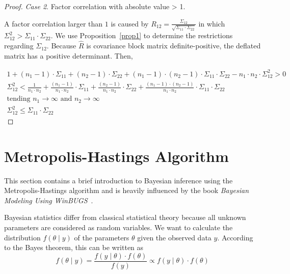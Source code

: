 \documentclass[11pt,fleqn]{book} %
\begin{document}
\begin{proof}
	\emph{Case 2}. Factor correlation with absolute value > 1.
	\begin{adjustwidth}{1cm}{0pt}
		A factor correlation larger than $1$ is caused by 
		$R_{12} = \frac{\Sigma_{12}}{\sqrt{\Sigma_{11} \cdot \Sigma_{22}}}$
		in which $\Sigma_{12}^2 > \Sigma_{11} \cdot \Sigma_{22}$.
		We use Proposition~\ref{prop1} to determine the restrictions regarding 
		$\Sigma_{12}$. Because $\widehat{R}$ is covariance block matrix 
		definite-positive, the deflated matrix has a positive determinant. 
		Then,
	\end{adjustwidth}
	\begin{displaymath}
		\begin{array}{l}
			1 + (n_1-1) \cdot \Sigma_{11} + (n_2-1) \cdot \Sigma_{22} +
			(n_1-1) \cdot (n_2-1) \cdot \Sigma_{11} \cdot \Sigma_{22} -
			n_1 \cdot n_2 \cdot \Sigma_{12}^2 > 0
			\\
			\Sigma_{12}^2 <
			\frac{1}{n_1 \cdot n_2} +
			\frac{(n_1-1)}{n_1 \cdot n_2} \cdot \Sigma_{11} +
			\frac{(n_2-1)}{n_1 \cdot n_2} \cdot \Sigma_{22} +
			\frac{(n_1-1) \cdot (n_2-1)}{n_1 \cdot n_2} \cdot \Sigma_{11} \cdot \Sigma_{22}
			\\
			\text{tending } n_1 \to \infty \text{ and } n_2 \to \infty
			\\
			\Sigma_{12}^2 \le \Sigma_{11} \cdot \Sigma_{22}
		\end{array}
	\end{displaymath}
\end{proof}

\section{Metropolis-Hastings Algorithm}
\label{ap:mha}

This section contains a brief introduction to Bayesian inference using 
the Metropolis-Hastings algorithm and is heavily influenced by the book 
\emph{Bayesian Modeling Using WinBUGS}~\cite{ntzoufras:2009}.

Bayesian statistics differ from classical statistical theory because all 
unknown parameters are considered as random variables. We want to calculate 
the distribution $f(\theta \mid y)$ of the parameters $\theta$ given the 
observed data $y$. According to the Bayes theorem, this can be written as
\begin{displaymath}
	f(\theta \mid y) = \frac{f(y \mid \theta) \cdot f(\theta)}{f(y)} \propto f(y \mid \theta) \cdot f(\theta)
\end{displaymath}
\end{document}
